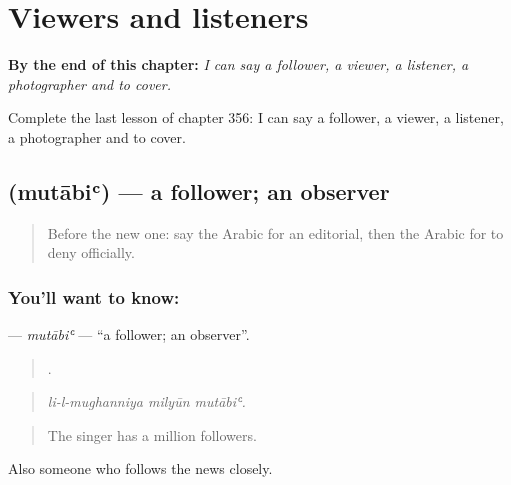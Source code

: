 
\chapter{Viewers and listeners}
\label{ch:ar-viewers-and-listeners}

\begin{chapteropening}
\textbf{By the end of this chapter:} \emph{I can say a follower, a viewer, a listener, a photographer and to cover.}

Complete the last lesson of chapter 356: I can say a follower, a viewer, a listener, a photographer and to cover.
\end{chapteropening}

\section[\texorpdfstring{\ar{متابع} (mutābiʿ)}{متابع (mutābiʿ)}]{ (mutābiʿ) — a follower; an observer}

\label{lesson:AR-C356-mutabi}



\begin{quote}
Before the new one: say the Arabic for an editorial, then the Arabic for to deny officially.
\end{quote}

\subsection*{You'll want to know: }
\textbf{} — \emph{mutābiʿ} — \textquotedblleft{}a follower; an observer\textquotedblright{}.

\begin{quote}
  .
\end{quote}

\begin{quote}
\emph{li-l-mughanniya milyūn mutābiʿ.}
\end{quote}

\begin{quote}
The singer has a million followers.
\end{quote}

Also someone who follows the news closely.

